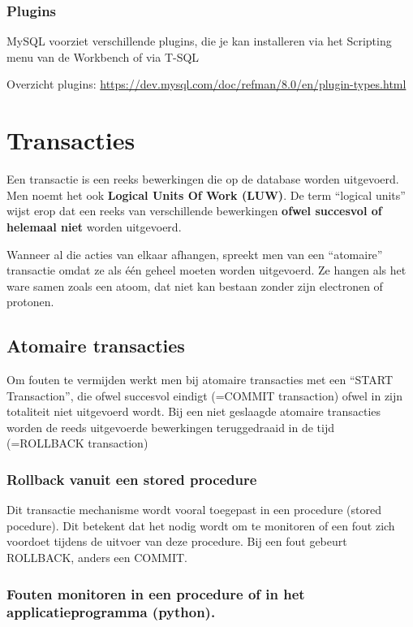 \documentclass{article}
\newcommand{\bold}[1]{\textbf{#1}}
\begin{document}
\subsubsection{Plugins}

MySQL voorziet verschillende plugins, die je kan installeren via het Scripting menu van de Workbench of via T-SQL

Overzicht plugins: \url{https://dev.mysql.com/doc/refman/8.0/en/plugin-types.html}

\section{Transacties}
Een transactie is een reeks bewerkingen die op de database worden uitgevoerd.
Men noemt het ook \bold{Logical Units Of Work (LUW)}. De term ``logical units'' wijst erop dat een
reeks van verschillende bewerkingen \bold{ofwel succesvol of helemaal niet} worden uitgevoerd.

Wanneer al die acties van elkaar afhangen, spreekt men van een ``atomaire''
transactie omdat ze als één geheel moeten worden uitgevoerd. Ze hangen als het ware samen zoals een atoom, dat
niet kan bestaan zonder zijn electronen of protonen.

\subsection{Atomaire transacties}

Om fouten te vermijden werkt men bij atomaire transacties met een ``START Transaction'', die ofwel succesvol
eindigt (=COMMIT transaction) ofwel in zijn totaliteit niet uitgevoerd wordt. Bij een niet geslaagde atomaire
transacties worden de reeds uitgevoerde bewerkingen teruggedraaid in de tijd (=ROLLBACK transaction)


\subsubsection{Rollback vanuit een stored procedure}

Dit transactie mechanisme wordt vooral toegepast in een procedure (stored pocedure). Dit betekent dat het nodig
wordt om te monitoren of een fout zich voordoet tijdens de uitvoer van deze procedure. Bij een fout gebeurt
ROLLBACK, anders een COMMIT.

\subsubsection{Fouten monitoren in een procedure of in het applicatieprogramma (python).}
\end{document}
